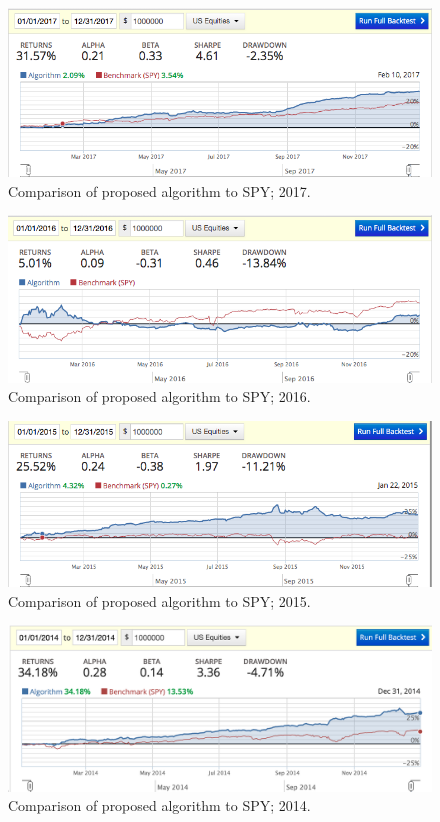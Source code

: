 \documentclass{article}
\begin{document}
\begin{figure}
\includegraphics[scale=0.5,bb=0 0 640 480]{figures/mad_mfd_macd_2017.png}
\caption{Comparison of proposed algorithm to SPY; 2017.}
\label{fig:backtest-2017}
\end{figure}

\begin{figure}
\includegraphics[scale=0.5,bb=0 0 640 480]{figures/mad_mfd_macd_2016.png}
\caption{Comparison of proposed algorithm to SPY; 2016.}
\label{fig:backtest-2016}
\end{figure}

\begin{figure}
\includegraphics[scale=0.5,bb=0 0 640 480]{figures/mad_mfd_macd_2015.png}
\caption{Comparison of proposed algorithm to SPY; 2015.}
\label{fig:backtest-2015}
\end{figure}

\begin{figure}
\includegraphics[scale=0.5,bb=0 0 640 480]{figures/mad_mfd_macd_2014.png}
\caption{Comparison of proposed algorithm to SPY; 2014.}
\label{fig:backtest-2014}
\end{figure}
\end{document}
